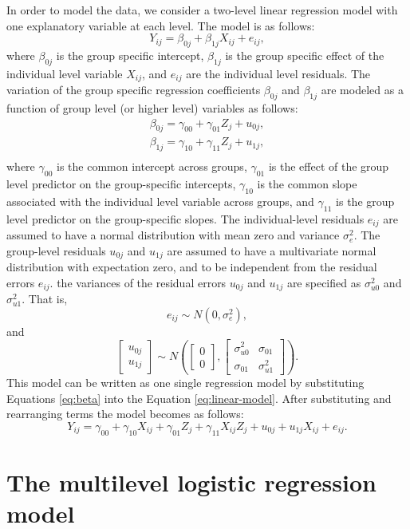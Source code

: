 \documentclass[12pt,oneside,a4paper]{reedthesis}
\begin{document}
In order to model the data, we consider a two-level linear regression model with one explanatory variable at each level. The model is as follows:
\begin{equation} 
Y_{i j}=\beta_{0 j}+\beta_{1 j} X_{i j}+e_{i j},
\label{eq:linear-model}
\end{equation}
where \(\beta_{0 j}\) is the group specific intercept, \(\beta_{1 j}\) is the group specific effect of the individual level variable \(X_{i j}\), and \(e_{ij}\) are the individual level residuals.
The variation of the group specific regression coefficients \(\beta_{0 j}\) and \(\beta_{1 j}\) are modeled as a function of group level (or higher level) variables as follows:
\begin{equation} 
\begin{array}{l}
{\beta_{0 j}=\gamma_{00}+\gamma_{01} Z_{j}+u_{0 j}}, \\
{\beta_{1 j}=\gamma_{10}+\gamma_{11} Z_{j}+u_{1 j}}, \\
\end{array}
\label{eq:beta}
\end{equation}
where \(\gamma_{00}\) is the common intercept across groups, \(\gamma_{01}\) is the effect of the group level predictor on the group-specific intercepts, \(\gamma_{10}\) is the common slope associated with the individual level variable across groups, and \(\gamma_{11}\) is the group level predictor on the group-specific slopes. The individual-level residuals \(e_{ij}\) are assumed to have a normal distribution with mean zero and variance \(\sigma^2_e\). The group-level residuals \(u_{0j}\) and \(u_{1j}\) are assumed to have a multivariate normal distribution with expectation zero, and to be independent from the residual errors \(e_{ij}\). the variances of the residual errors \(u_{0j}\) and \(u_{1j}\) are specified as \(\sigma_{u0}^{2}\) and \(\sigma_{u1}^{2}\). That is,
\[
e_{ij} \sim N(0,\sigma^2_e),
\]
and
\[
\left[\begin{array}{l}{u_{0 j}} \\
{u_{1 j}}\end{array}\right] \sim N\left(\left[\begin{array}{l}{0} \\
{0}\end{array}\right],\left[\begin{array}{cc}{\sigma_{u0}^{2}} & {\sigma_{01}} \\ {\sigma_{01}} & {\sigma_{u1}^{2}}\end{array}\right]\right).
\]
This model can be written as one single regression model by substituting Equations \eqref{eq:beta} into the Equation \eqref{eq:linear-model}. After substituting and rearranging terms the model becomes as follows:
\begin{equation} 
Y_{i j}=\gamma_{00}+\gamma_{10} X_{i j}+\gamma_{01} Z_{j}+\gamma_{11} X_{i j} Z_{j}+u_{0 j}+u_{1 j} X_{i j}+e_{i j}.
\label{eq:linear-single}
\end{equation}
\hypertarget{the-multilevel-logistic-regression-model}{%
\section{The multilevel logistic regression model}\label{the-multilevel-logistic-regression-model}}
\end{document}
